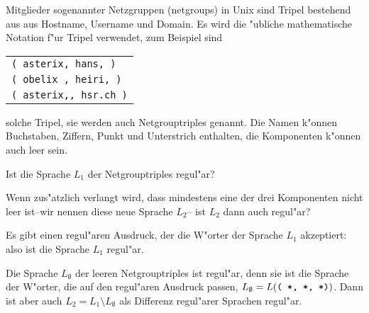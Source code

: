 Mitglieder sogenannter Netzgruppen (netgroups) in Unix sind Tripel
bestehend aus aus Hostname, Username und Domain. Es wird die "ubliche
mathematische Notation f"ur Tripel verwendet, zum Beispiel sind
\begin{center}
\begin{tabular}{l}
{\tt ( asterix, hans, )}\\
{\tt ( obelix , heiri, )}\\
{\tt ( asterix,, hsr.ch )}
\end{tabular}
\end{center}
solche Tripel, sie werden auch Netgrouptriples genannt.
Die Namen k"onnen Buchstaben, Ziffern, Punkt und Unterstrich
enthalten, die Komponenten k"onnen auch leer sein.
\begin{teilaufgaben}
\item
Ist die Sprache $L_1$ der Netgrouptriples regul"ar?
\item
Wenn zus"atzlich verlangt wird, dass mindestens eine der drei
Komponenten nicht leer ist--wir nennen diese neue Sprache $L_2$-- ist $L_2$
dann auch regul"ar?
\end{teilaufgaben}

\begin{loesung}
\begin{teilaufgaben}
\item
Es gibt einen regul"aren Ausdruck, der die W"orter der Sprache $L_1$
akzeptiert:
also ist die Sprache $L_1$ regul"ar.
\item
Die Sprache $L_\emptyset$ der leeren Netgrouptriples ist regul"ar, denn sie ist die
Sprache der W"orter, die auf den regul"aren Ausdruck
passen, $L_\emptyset = L(\text{\tt ( *, *, *)})$. Dann ist
aber auch $L_2=L_1\setminus L_\emptyset$ als Differenz regul"arer
Sprachen regul"ar.
\qedhere
\end{teilaufgaben}
\end{loesung}
